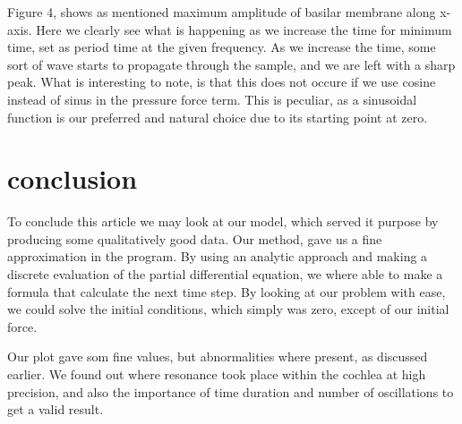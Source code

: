 \documentclass[twoside,twocolumn]{article}
\begin{document}
Figure 4, shows as mentioned maximum amplitude of basilar membrane along x-axis. Here we clearly see what is happening as we increase the time for minimum time, set as period time at the given frequency. As we increase the time, some sort of wave starts to propagate through the sample, and we are left with a sharp peak. What is interesting to note, is that this does not occure if we use cosine instead of sinus in the pressure force term. This is peculiar, as a sinusoidal function is our preferred and natural choice due to its starting point at zero. 



\section{conclusion}


To conclude this article we may look at our model, which served it purpose by producing some qualitatively good data. Our method, gave us a fine approximation in the program. By using an analytic approach and making a discrete evaluation of the partial differential equation, we where able to make a formula that calculate the next time step. By looking at our problem with ease, we could solve the initial conditions, which simply was zero, except of our initial force.  

\bigskip

Our plot gave som fine values, but abnormalities where present, as discussed earlier. We found out where resonance took place within the cochlea at high precision, and also the importance of time duration and number of oscillations to get a valid result. \cite{Inselberg2005}


\onecolumn



\end{document}
